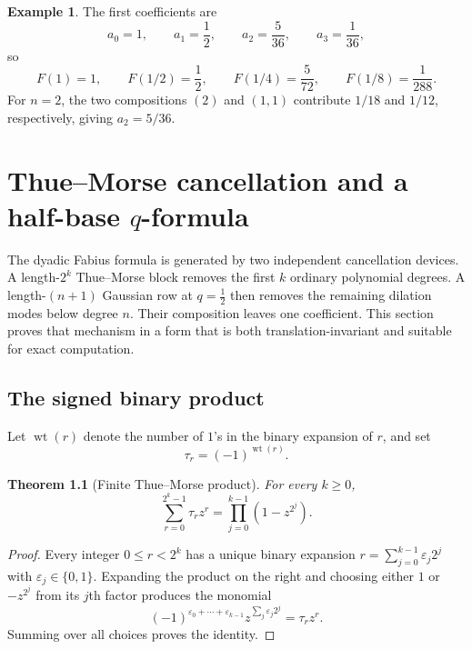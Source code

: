 \documentclass[11pt,oneside,openany]{book}
\newtheorem{theorem}{Theorem}[chapter]
\theoremstyle{definition}
\newtheorem{example}[theorem]{Example}
\theoremstyle{remark}
\newcommand{\wt}{\operatorname{wt}}
\begin{document}
\begin{example}
The first coefficients are
\[
 a_0=1,
 \qquad a_1=\frac12,
 \qquad a_2=\frac5{36},
 \qquad a_3=\frac1{36},
\]
so
\[
 F(1)=1,
 \qquad F(1/2)=\frac12,
 \qquad F(1/4)=\frac5{72},
 \qquad F(1/8)=\frac1{288}.
\]
For $n=2$, the two compositions $(2)$ and $(1,1)$ contribute $1/18$ and $1/12$, respectively, giving $a_2=5/36$.
\end{example}


\chapter{Thue--Morse cancellation and a half-base \texorpdfstring{$q$}{q}-formula}\label{chap:fabius-qformula}

The dyadic Fabius formula is generated by two independent cancellation devices.  A length-$2^k$ Thue--Morse block removes the first $k$ ordinary polynomial degrees.  A length-$(n+1)$ Gaussian row at $q=\tfrac12$ then removes the remaining dilation modes below degree $n$.  Their composition leaves one coefficient.  This section proves that mechanism in a form that is both translation-invariant and suitable for exact computation.

\section{The signed binary product}

Let $\wt(r)$ denote the number of $1$'s in the binary expansion of $r$, and set
\begin{equation}
 \tau_r=(-1)^{\wt(r)}.\label{eq:thue-morse-sign}
\end{equation}

\begin{theorem}[Finite Thue--Morse product]\label{thm:thue-morse-product}
For every $k\ge0$,
\begin{equation}
 \sum_{r=0}^{2^k-1}\tau_rz^r
 =\prod_{j=0}^{k-1}(1-z^{2^j}).\label{eq:thue-morse-product}
\end{equation}
\end{theorem}

\begin{proof}
Every integer $0\le r<2^k$ has a unique binary expansion
$r=\sum_{j=0}^{k-1}\varepsilon_j2^j$ with $\varepsilon_j\in\{0,1\}$.  Expanding the product on the right and choosing either $1$ or $-z^{2^j}$ from its $j$th factor produces the monomial
\[
 (-1)^{\varepsilon_0+\cdots+\varepsilon_{k-1}}
 z^{\sum_j\varepsilon_j2^j}=\tau_rz^r.
\]
Summing over all choices proves the identity.
\end{proof}
\end{document}
